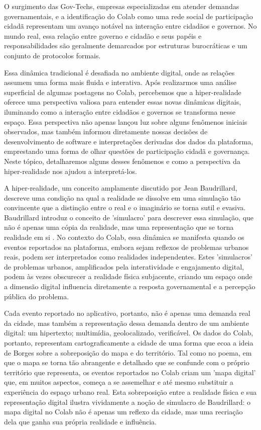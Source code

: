 O surgimento das Gov-Techs, empresas especializadas em atender demandas governamentais, e a identificação do Colab como uma rede social de participação cidadã representam um avanço notável na interação entre cidadãos e governos. No mundo real, essa relação entre governo e cidadão e seus papéis e responsabilidades são geralmente demarcados por estruturas burocráticas e um conjunto de protocolos formais. 

Essa dinâmica tradicional é desafiada no ambiente digital, onde as relações assumem uma forma mais fluida e interativa. Após realizarmos uma análise superficial de algumas postagens no Colab, percebemos que a hiper-realidade oferece uma perspectiva valiosa para entender essas novas dinâmicas digitais, iluminando como a interação entre cidadãos e governos se transforma nesse espaço. Essa perspectiva não apenas lançou luz sobre alguns fenômenos iniciais observados, mas também informou diretamente nossas decisões de desenvolvimento de software e interpretações derivadas dos dados da plataforma, emprestando uma forma de olhar questões de participação cidadã e governança. Neste tópico, detalharemos alguns desses fenômenos e como a perspectiva da hiper-realidade nos ajudou a interpretá-los.

A hiper-realidade, um conceito amplamente discutido por Jean Baudrillard, descreve uma condição na qual a realidade se dissolve em uma simulação tão convincente que a distinção entre o real e o imaginário se torna sutil e evasiva. Baudrillard introduz o conceito de 'simulacro' para descrever essa simulação, que não é apenas uma cópia da realidade, mas uma representação que se torna realidade em si \cite{1994_Baudrillard_BOOK}. No contexto do Colab, essa dinâmica se manifesta quando os eventos reportados na plataforma, embora sejam reflexos de problemas urbanos reais, podem ser interpretados como realidades independentes. Estes 'simulacros' de problemas urbanos, amplificados pela interatividade e engajamento digital, podem às vezes obscurecer a realidade física subjacente, criando um espaço onde a dimensão digital influencia diretamente a resposta governamental e a percepção pública do problema.

Cada evento reportado no aplicativo, portanto, não é apenas uma demanda real da cidade, mas também a representação dessa demanda dentro de um ambiente digital: um hipertexto; multimídia, geolocalizado, verificável. Os dados do Colab, portanto, representam cartograficamente a cidade de uma forma que ecoa a ideia de Borges sobre a sobreposição do mapa e do território. Tal como no poema, em que o mapa se torna tão abrangente e detalhado que se confunde com o próprio território que representa, os eventos reportados no Colab criam um 'mapa digital' que, em muitos aspectos, começa a se assemelhar e até mesmo substituir a experiência do espaço urbano real. Esta sobreposição entre a realidade física e sua representação digital ilustra vividamente a noção de simulacro de Baudrillard: o mapa digital no Colab não é apenas um reflexo da cidade, mas uma recriação dela que ganha sua própria realidade e influência.

